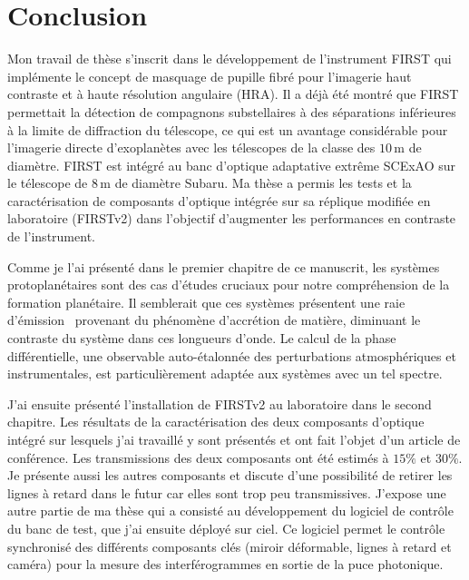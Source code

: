 \chapter*{Conclusion}


Mon travail de thèse s'inscrit dans le développement de l'instrument FIRST qui implémente le concept de masquage de pupille fibré pour l'imagerie haut contraste et à haute résolution angulaire (HRA). Il a déjà été montré que FIRST permettait la détection de compagnons substellaires à des séparations inférieures à la limite de diffraction du télescope, ce qui est un avantage considérable pour l'imagerie directe d'exoplanètes avec les télescopes de la classe des $10 \,$m de diamètre. FIRST est intégré au banc d'optique adaptative extrême SCExAO sur le télescope de $8 \,$m de diamètre Subaru. Ma thèse a permis les tests et la caractérisation de composants d'optique intégrée sur sa réplique modifiée en laboratoire (FIRSTv2) dans l'objectif d'augmenter les performances en contraste de l'instrument.

Comme je l'ai présenté dans le premier chapitre de ce manuscrit, les systèmes protoplanétaires sont des cas d'études cruciaux pour notre compréhension de la formation planétaire. Il semblerait que ces systèmes présentent une raie d'émission \ha~provenant du phénomène d'accrétion de matière, diminuant le contraste du système dans ces longueurs d'onde. Le calcul de la phase différentielle, une observable auto-étalonnée des perturbations atmosphériques et instrumentales, est particulièrement adaptée aux systèmes avec un tel spectre.

J'ai ensuite présenté l'installation de FIRSTv2 au laboratoire dans le second chapitre. Les résultats de la caractérisation des deux composants d'optique intégré sur lesquels j'ai travaillé y sont présentés et ont fait l'objet d'un article de conférence. Les transmissions des deux composants ont été estimés à $15\%$ et $30\%$. Je présente aussi les autres composants et discute d'une possibilité de retirer les lignes à retard dans le futur car elles sont trop peu transmissives. J'expose une autre partie de ma thèse qui a consisté au développement du logiciel de contrôle du banc de test, que j'ai ensuite déployé sur ciel. Ce logiciel permet le contrôle synchronisé des différents composants clés (miroir déformable, lignes à retard et caméra) pour la mesure des interférogrammes en sortie de la puce photonique.

